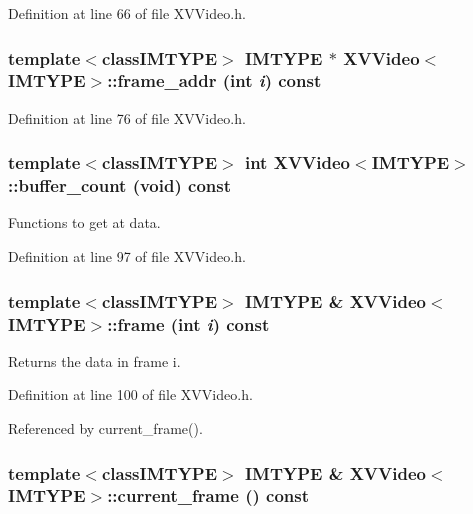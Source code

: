 Definition at line 66 of file XVVideo.h.\label{XVVideo_b3}
\hypertarget{class_XVVideo_b3}{
\subsubsection[frame_addr]{\setlength{\rightskip}{0pt plus 5cm}template$<$classIMTYPE$>$ IMTYPE $\ast$ XVVideo$<$IMTYPE$>$::frame\_\-addr (int {\em i}) const}}




Definition at line 76 of file XVVideo.h.\label{XVVideo_a2}
\hypertarget{class_XVVideo_a2}{
\subsubsection[buffer_count]{\setlength{\rightskip}{0pt plus 5cm}template$<$classIMTYPE$>$ int XVVideo$<$IMTYPE$>$::buffer\_\-count (void) const}}


Functions to get at data.



Definition at line 97 of file XVVideo.h.\label{XVVideo_a3}
\hypertarget{class_XVVideo_a3}{
\subsubsection[frame]{\setlength{\rightskip}{0pt plus 5cm}template$<$classIMTYPE$>$ IMTYPE \& XVVideo$<$IMTYPE$>$::frame (int {\em i}) const}}


Returns the data in frame i.



Definition at line 100 of file XVVideo.h.

Referenced by current\_\-frame().\label{XVVideo_a4}
\hypertarget{class_XVVideo_a4}{
\subsubsection[current_frame]{\setlength{\rightskip}{0pt plus 5cm}template$<$classIMTYPE$>$ IMTYPE \& XVVideo$<$IMTYPE$>$::current\_\-frame () const}}


